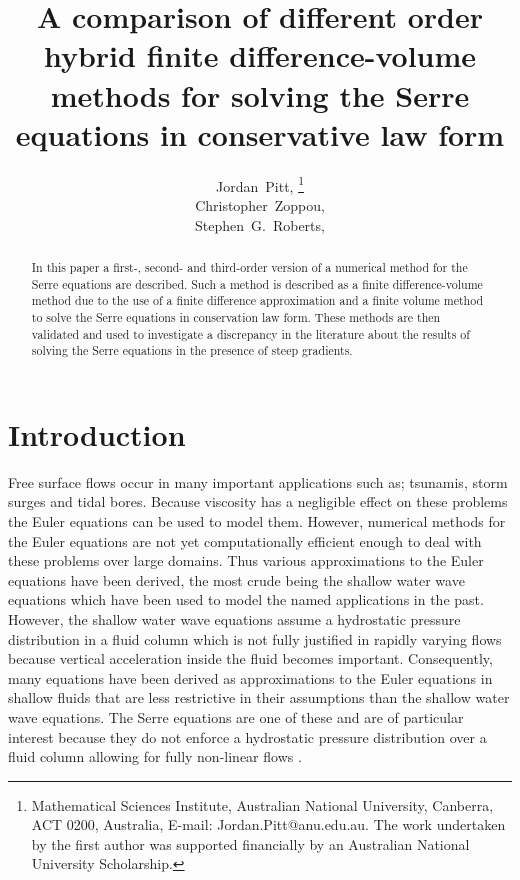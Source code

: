 \documentclass[SingleSpace,12pt,Proceedings]{Serre_ASCE}
\begin{document}
\title{A comparison of different order hybrid finite difference-volume methods for solving the Serre equations in conservative law form}

\author{
Jordan~Pitt,%
\thanks{Mathematical Sciences Institute, Australian National University, Canberra, ACT 0200, Australia, E-mail: Jordan.Pitt@anu.edu.au. The work undertaken by the first author was supported financially by an Australian National University Scholarship.}
\\
Christopher~Zoppou,\footnotemark[1]%
%
\\
Stephen~G.~Roberts,\footnotemark[1]
}

\maketitle

\begin{abstract}
In this paper a first-, second- and third-order version of a numerical method for the Serre equations are described. Such a method is described as a finite difference-volume method due to the use of a finite difference approximation and a finite volume method to solve the Serre equations in conservation law form. These methods are then validated and used to investigate a discrepancy in the literature about the results of solving the Serre equations in the presence of steep gradients. 

\end{abstract}


\linenumbers

\section{Introduction} \label{intro}
Free surface flows occur in many important applications such as; tsunamis, storm surges and tidal bores. Because viscosity has a negligible effect on these problems the Euler equations can be used to model them. However, numerical methods for the Euler equations are not yet computationally efficient enough to deal with these problems over large domains. Thus various approximations to the Euler equations have been derived, the most crude being the shallow water wave equations which have been used to model the named applications in the past. However, the shallow water wave equations assume a hydrostatic pressure distribution in a fluid column which is not fully justified in rapidly varying flows because vertical acceleration inside the fluid becomes important. Consequently, many equations have been derived as approximations to the Euler equations in shallow fluids that are less restrictive in their assumptions than the shallow water wave equations. The Serre equations are one of these and are of particular interest because they do not enforce a hydrostatic pressure distribution over a fluid column allowing for fully non-linear flows \cite{Bonneton-Lannes-2009-16601}. 
\end{document}
